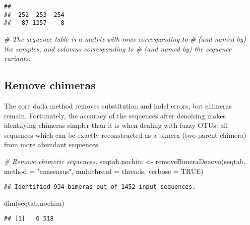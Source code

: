 \documentclass[
]{article}
\newenvironment{Shaded}{\begin{snugshade}}{\end{snugshade}}
\newcommand{\AttributeTok}[1]{\textcolor[rgb]{0.77,0.63,0.00}{#1}}
\newcommand{\CommentTok}[1]{\textcolor[rgb]{0.56,0.35,0.01}{\textit{#1}}}
\newcommand{\ConstantTok}[1]{\textcolor[rgb]{0.00,0.00,0.00}{#1}}
\newcommand{\FunctionTok}[1]{\textcolor[rgb]{0.00,0.00,0.00}{#1}}
\newcommand{\NormalTok}[1]{#1}
\newcommand{\OtherTok}[1]{\textcolor[rgb]{0.56,0.35,0.01}{#1}}
\newcommand{\StringTok}[1]{\textcolor[rgb]{0.31,0.60,0.02}{#1}}
\begin{document}
\begin{verbatim}
## 
##  252  253  254 
##   87 1357    8
\end{verbatim}

\begin{Shaded}
\begin{Highlighting}[]
\CommentTok{\# The sequence table is a matrix with rows corresponding to}
\CommentTok{\# (and named by) the samples, and columns corresponding to}
\CommentTok{\# (and named by) the sequence variants.}
\end{Highlighting}
\end{Shaded}

\hypertarget{remove-chimeras}{%
\subsection{Remove chimeras}\label{remove-chimeras}}

The core dada method removes substitution and indel errors, but chimeras
remain. Fortunately, the accuracy of the sequences after denoising makes
identifying chimeras simpler than it is when dealing with fuzzy OTUs:
all sequences which can be exactly reconstructed as a bimera (two-parent
chimera) from more abundant sequences.

\begin{Shaded}
\begin{Highlighting}[]
\CommentTok{\# Remove chimeric sequences:}
\NormalTok{seqtab.nochim }\OtherTok{\textless{}{-}} \FunctionTok{removeBimeraDenovo}\NormalTok{(seqtab, }\AttributeTok{method =} \StringTok{"consensus"}\NormalTok{, }
    \AttributeTok{multithread =}\NormalTok{ threads, }\AttributeTok{verbose =} \ConstantTok{TRUE}\NormalTok{)}
\end{Highlighting}
\end{Shaded}

\begin{verbatim}
## Identified 934 bimeras out of 1452 input sequences.
\end{verbatim}

\begin{Shaded}
\begin{Highlighting}[]
\FunctionTok{dim}\NormalTok{(seqtab.nochim)}
\end{Highlighting}
\end{Shaded}

\begin{verbatim}
## [1]   6 518
\end{verbatim}
\end{document}
